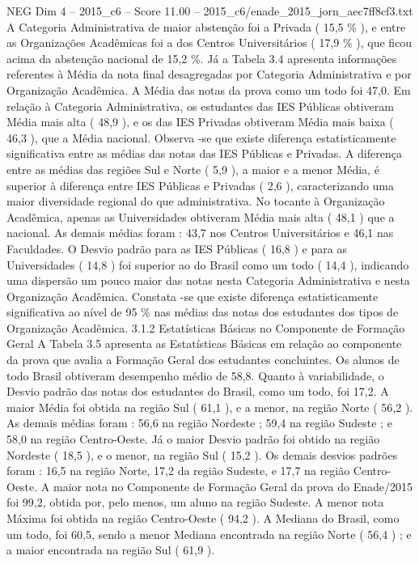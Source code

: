 \begin{textsample}{NEG Dim 4 – 2015\_c6 – Score 11.00 – 2015\_c6/enade\_2015\_jorn\_aec7ff8cf3.txt}
A Categoria Administrativa de maior abstenção foi a Privada ( 15,5 \% ), e entre as Organizações Acadêmicas foi a dos Centros Universitários ( 17,9 \% ), que ficou acima da abstenção nacional de 15,2 \%.
Já a Tabela 3.4 apresenta informações referentes à Média da nota final desagregadas por Categoria Administrativa e por Organização Acadêmica.
A Média das notas da prova como um todo foi 47,0.
Em relação à Categoria Administrativa, os estudantes das IES Públicas obtiveram Média mais alta ( 48,9 ), e os das IES Privadas obtiveram Média mais baixa ( 46,3 ), que a Média nacional.
Observa -se que existe diferença estatisticamente significativa entre as médias das notas das IES Públicas e Privadas.
A diferença entre as médias das regiões Sul e Norte ( 5,9 ), a maior e a menor Média, é superior à diferença entre IES Públicas e Privadas ( 2,6 ), caracterizando uma maior diversidade regional do que administrativa.
No tocante à Organização Acadêmica, apenas as Universidades obtiveram Média mais alta ( 48,1 ) que a nacional.
As demais médias foram : 43,7 nos Centros Universitários e 46,1 nas Faculdades.
O Desvio padrão para as IES Públicas ( 16,8 ) e para as Universidades ( 14,8 ) foi superior ao do Brasil como um todo ( 14,4 ), indicando uma dispersão um pouco maior das notas nesta Categoria Administrativa e nesta Organização Acadêmica.
Constata -se que existe diferença estatisticamente significativa ao nível de 95 \% nas médias das notas dos estudantes dos tipos de Organização Acadêmica. 3.1.2 Estatísticas Básicas no Componente de Formação Geral A Tabela 3.5 apresenta as Estatísticas Básicas em relação ao componente da prova que avalia a Formação Geral dos estudantes concluintes.
Os alunos de todo Brasil obtiveram desempenho médio de 58,8.
Quanto à variabilidade, o Desvio padrão das notas dos estudantes do Brasil, como um todo, foi 17,2.
A maior Média foi obtida na região Sul ( 61,1 ), e a menor, na região Norte ( 56,2 ).
As demais médias foram : 56,6 na região Nordeste ; 59,4 na região Sudeste ; e 58,0 na região Centro-Oeste.
Já o maior Desvio padrão foi obtido na região Nordeste ( 18,5 ), e o menor, na região Sul ( 15,2 ).
Os demais desvios padrões foram : 16,5 na região Norte, 17,2 da região Sudeste, e 17,7 na região Centro-Oeste.
A maior nota no Componente de Formação Geral da prova do Enade/2015 foi 99,2, obtida por, pelo menos, um aluno na região Sudeste.
A menor nota Máxima foi obtida na região Centro-Oeste ( 94,2 ).
A Mediana do Brasil, como um todo, foi 60,5, sendo a menor Mediana encontrada na região Norte ( 56,4 ) ; e a maior encontrada na região Sul ( 61,9 ).

\end{textsample}
